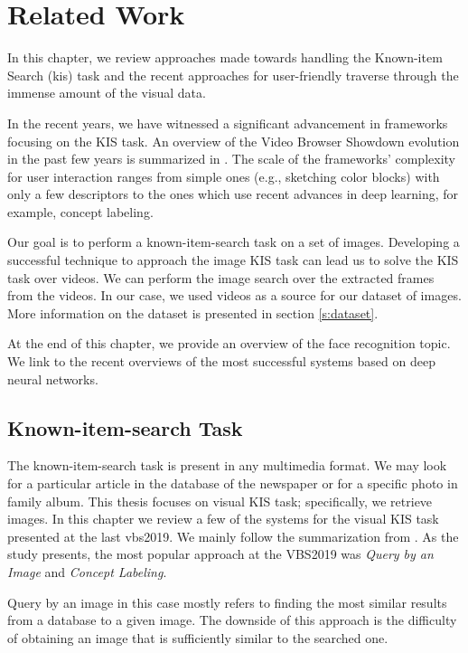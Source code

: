 \chapter{Related Work}
\label{ch:related_work}


In this chapter, we review approaches made towards handling the Known-item Search (\acrshort{kis}) task and the recent approaches for user-friendly traverse through the immense amount of the visual data.

In the recent years, we have witnessed a significant advancement in frameworks focusing on the KIS task. An overview of the Video Browser Showdown evolution in the past few years is summarized in \citep{lokovc2018influential}. The scale of the frameworks' complexity for user interaction ranges from simple ones (e.g., sketching color blocks) with only a few descriptors to the ones which use recent advances in deep learning, for example, concept labeling.

Our goal is to perform a known-item-search task on a set of images. Developing a successful technique to approach the image KIS task can lead us to solve the KIS task over videos. We can perform the image search over the extracted frames from the videos. In our case, we used videos as a source for our dataset of images. More information on the dataset is presented in section \ref{s:dataset}.

At the end of this chapter, we provide an overview of the face recognition topic. We link to the recent overviews of the most successful systems based on deep neural networks.

\section{Known-item-search Task}

The known-item-search task is present in any multimedia format. We may look for a particular article in the database of the newspaper or for a specific photo in family album. This thesis focuses on visual KIS task; specifically, we retrieve images. In this chapter we review a few of the systems for the visual KIS task presented at the last \acrshort{vbs}2019. We mainly follow the summarization from \cite{rossetto2020interactive}. As the study presents, the most popular approach at the VBS2019 was \emph{Query by an Image} and \emph{Concept Labeling}. 

Query by an image in this case mostly refers to finding the most similar results from a database to a given image. The downside of this approach is the difficulty of obtaining an image that is sufficiently similar to the searched one.


